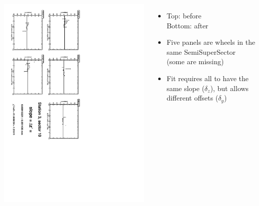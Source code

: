\documentclass[compress]{beamer}
\begin{document}
\begin{frame}
\begin{columns}
\vfill
\includegraphics[height=\linewidth, angle=90]{zfits_after/zfit_3_10.pdf}
\begin{itemize}
\item Top: before \\ Bottom: after
\item Five panels are wheels in the same SemiSuperSector (some are missing)
\item Fit requires all to have the same slope ($\delta_z$), but allows different offsets ($\delta_y$)
\end{itemize}
\end{columns}
\end{frame}
\end{document}
